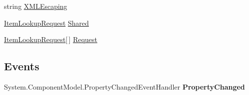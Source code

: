 \begin{DoxyCompactItemize}
\begin{DoxyCompactList}\small\item\em \end{DoxyCompactList}\item 
\hypertarget{class_price___comparison_1_1amazon_1_1ecs_1_1_item_lookup_a758faec03b4f64f626839050bfd9ba29}{string \hyperlink{class_price___comparison_1_1amazon_1_1ecs_1_1_item_lookup_a758faec03b4f64f626839050bfd9ba29}{X\-M\-L\-Escaping}}\label{class_price___comparison_1_1amazon_1_1ecs_1_1_item_lookup_a758faec03b4f64f626839050bfd9ba29}

\begin{DoxyCompactList}\small\item\em \end{DoxyCompactList}\item 
\hypertarget{class_price___comparison_1_1amazon_1_1ecs_1_1_item_lookup_a32596483d7f2593fdcd9561af0df3d36}{\hyperlink{class_price___comparison_1_1amazon_1_1ecs_1_1_item_lookup_request}{Item\-Lookup\-Request} \hyperlink{class_price___comparison_1_1amazon_1_1ecs_1_1_item_lookup_a32596483d7f2593fdcd9561af0df3d36}{Shared}}\label{class_price___comparison_1_1amazon_1_1ecs_1_1_item_lookup_a32596483d7f2593fdcd9561af0df3d36}

\begin{DoxyCompactList}\small\item\em \end{DoxyCompactList}\item 
\hypertarget{class_price___comparison_1_1amazon_1_1ecs_1_1_item_lookup_ab4019e6bbd9e7758623c53c247a7f4eb}{\hyperlink{class_price___comparison_1_1amazon_1_1ecs_1_1_item_lookup_request}{Item\-Lookup\-Request}\mbox{[}$\,$\mbox{]} \hyperlink{class_price___comparison_1_1amazon_1_1ecs_1_1_item_lookup_ab4019e6bbd9e7758623c53c247a7f4eb}{Request}}\label{class_price___comparison_1_1amazon_1_1ecs_1_1_item_lookup_ab4019e6bbd9e7758623c53c247a7f4eb}

\begin{DoxyCompactList}\small\item\em \end{DoxyCompactList}\end{DoxyCompactItemize}
\subsection*{Events}
\begin{DoxyCompactItemize}
\item 
\hypertarget{class_price___comparison_1_1amazon_1_1ecs_1_1_item_lookup_a8e94c54a3804c5987c096962eed51673}{System.\-Component\-Model.\-Property\-Changed\-Event\-Handler {\bfseries Property\-Changed}}\label{class_price___comparison_1_1amazon_1_1ecs_1_1_item_lookup_a8e94c54a3804c5987c096962eed51673}

\end{DoxyCompactItemize}
